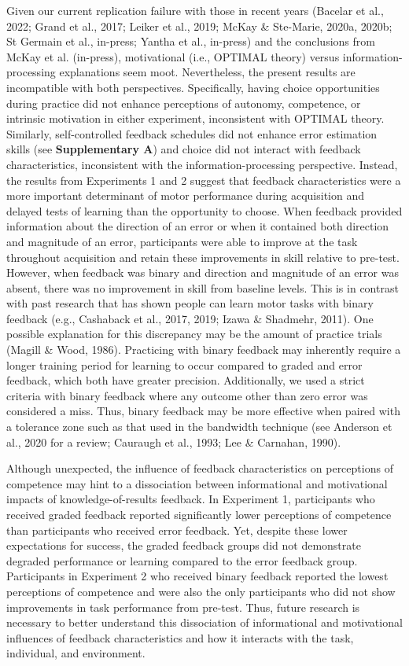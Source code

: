 \documentclass[
  doc, donotrepeattitle,floatsintext]{apa7}
\begin{document}
Given our current replication failure with those in recent years (Bacelar et al., 2022; Grand et al., 2017; Leiker et al., 2019; McKay \& Ste-Marie, 2020a, 2020b; St Germain et al., in-press; Yantha et al., in-press) and the conclusions from McKay et al. (in-press), motivational (i.e., OPTIMAL theory) versus information-processing explanations seem moot. Nevertheless, the present results are incompatible with both perspectives. Specifically, having choice opportunities during practice did not enhance perceptions of autonomy, competence, or intrinsic motivation in either experiment, inconsistent with OPTIMAL theory. Similarly, self-controlled feedback schedules did not enhance error estimation skills (see \textbf{Supplementary A}) and choice did not interact with feedback characteristics, inconsistent with the information-processing perspective. Instead, the results from Experiments 1 and 2 suggest that feedback characteristics were a more important determinant of motor performance during acquisition and delayed tests of learning than the opportunity to choose. When feedback provided information about the direction of an error or when it contained both direction and magnitude of an error, participants were able to improve at the task throughout acquisition and retain these improvements in skill relative to pre-test. However, when feedback was binary and direction and magnitude of an error was absent, there was no improvement in skill from baseline levels. This is in contrast with past research that has shown people can learn motor tasks with binary feedback (e.g., Cashaback et al., 2017, 2019; Izawa \& Shadmehr, 2011). One possible explanation for this discrepancy may be the amount of practice trials (Magill \& Wood, 1986). Practicing with binary feedback may inherently require a longer training period for learning to occur compared to graded and error feedback, which both have greater precision. Additionally, we used a strict criteria with binary feedback where any outcome other than zero error was considered a miss. Thus, binary feedback may be more effective when paired with a tolerance zone such as that used in the bandwidth technique (see Anderson et al., 2020 for a review; Cauraugh et al., 1993; Lee \& Carnahan, 1990).

Although unexpected, the influence of feedback characteristics on perceptions of competence may hint to a dissociation between informational and motivational impacts of knowledge-of-results feedback. In Experiment 1, participants who received graded feedback reported significantly lower perceptions of competence than participants who received error feedback. Yet, despite these lower expectations for success, the graded feedback groups did not demonstrate degraded performance or learning compared to the error feedback group. Participants in Experiment 2 who received binary feedback reported the lowest perceptions of competence and were also the only participants who did not show improvements in task performance from pre-test. Thus, future research is necessary to better understand this dissociation of informational and motivational influences of feedback characteristics and how it interacts with the task, individual, and environment.
\end{document}
